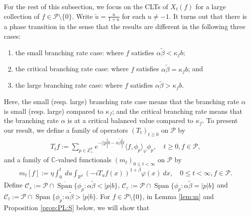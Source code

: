 \documentclass[12pt,a4paper]{amsart}
\theoremstyle{plain}
\theoremstyle{definition}
\numberwithin{equation}{section}
\begin{document}
For the rest of this subsection, we focus on the CLTs of $X_t(f)$ for a large collection of $f\in \mathcal P\setminus \{0\}$.
Write $\tilde u = \frac{u}{ 1+ u}$ for each $u \neq -1$.
It turns out that there is a phase transition in the sense that the results are different in the following three cases:
\begin{enumerate}
\item
  the small branching rate case: where
$f$ satisfies $\alpha \tilde \beta < \kappa_f b$;
\item
  the critical branching rate case: where
$f$ satisfies $\alpha \tilde \beta = \kappa_f b$; and
\item
  the large branching rate case:  where
$f$ satisfies $\alpha \tilde \beta > \kappa_f b$.
\end{enumerate}
Here, the small (resp. large) branching rate case means that the branching rate $\alpha$ is small (resp. large) compared to $\kappa_f$;
 and the critical branching rate means that the branching rate $\alpha$ is at a critical balanced value compared to $\kappa_f$.
To present our result, we define a family of operators $(T_t)_{t\geq 0}$ on $\mathcal P$ by
\begin{align}
  \label{eq:I:R:1}
  T_t f
  := \sum_{p \in \mathbb Z_+^d} e^{-| |p|b - \alpha \tilde \beta |t} \langle f, \phi_p \rangle_{\varphi} \phi_p
  ,\quad t\geq 0, f\in \mathcal P,
\end{align}
and a family of $\mathbb C$-valued functionals $(m_t)_{0 \leq t < \infty}$ on $\mathcal P$ by
\begin{align}
  \label{eq:I:R:2}
  m_t[f]
  := \eta \int_0^t ~du \int_{\mathbb R^d} (-iT_u f(x))^{1+\beta} \varphi(x) ~dx
  , \quad 0 \leq t< \infty, f\in \mathcal P.
\end{align}
Define $ \mathcal C_s := \mathcal P \cap \overline{\operatorname{Span}} \{ \phi_p: \alpha \tilde \beta < |p| b \}$, $\mathcal C_c   := \mathcal P \cap \operatorname{Span} \{ \phi_p : \alpha \tilde \beta = |p| b \} $
and $ \mathcal C_l   := \mathcal P \cap \operatorname{Span} \{ \phi_p: \alpha \tilde \beta > |p| b \}$. For $f\in \mathcal P\setminus \{0\}$, in Lemma \ref{lem:m} and Proposition \ref{prop:PL:S} below, we will show that
\end{document}
